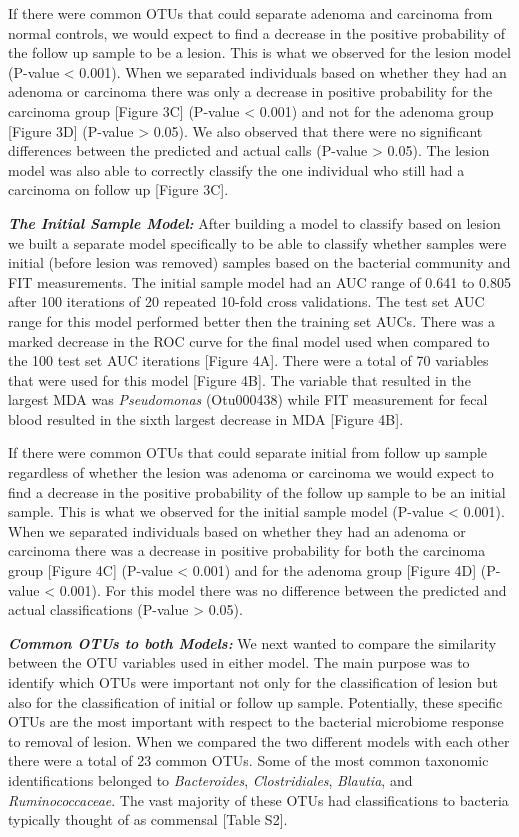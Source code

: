 \documentclass[12pt,]{article}
\begin{document}
If there were common OTUs that could separate adenoma and carcinoma from
normal controls, we would expect to find a decrease in the positive
probability of the follow up sample to be a lesion. This is what we
observed for the lesion model (P-value \textless{} 0.001). When we
separated individuals based on whether they had an adenoma or carcinoma
there was only a decrease in positive probability for the carcinoma
group {[}Figure 3C{]} (P-value \textless{} 0.001) and not for the
adenoma group {[}Figure 3D{]} (P-value \textgreater{} 0.05). We also
observed that there were no significant differences between the
predicted and actual calls (P-value \textgreater{} 0.05). The lesion
model was also able to correctly classify the one individual who still
had a carcinoma on follow up {[}Figure 3C{]}.

\textbf{\emph{The Initial Sample Model:}} After building a model to
classify based on lesion we built a separate model specifically to be
able to classify whether samples were initial (before lesion was
removed) samples based on the bacterial community and FIT measurements.
The initial sample model had an AUC range of 0.641 to 0.805 after 100
iterations of 20 repeated 10-fold cross validations. The test set AUC
range for this model performed better then the training set AUCs. There
was a marked decrease in the ROC curve for the final model used when
compared to the 100 test set AUC iterations {[}Figure 4A{]}. There were
a total of 70 variables that were used for this model {[}Figure 4B{]}.
The variable that resulted in the largest MDA was \emph{Pseudomonas}
(Otu000438) while FIT measurement for fecal blood resulted in the sixth
largest decrease in MDA {[}Figure 4B{]}.

If there were common OTUs that could separate initial from follow up
sample regardless of whether the lesion was adenoma or carcinoma we
would expect to find a decrease in the positive probability of the
follow up sample to be an initial sample. This is what we observed for
the initial sample model (P-value \textless{} 0.001). When we separated
individuals based on whether they had an adenoma or carcinoma there was
a decrease in positive probability for both the carcinoma group
{[}Figure 4C{]} (P-value \textless{} 0.001) and for the adenoma group
{[}Figure 4D{]} (P-value \textless{} 0.001). For this model there was no
difference between the predicted and actual classifications (P-value
\textgreater{} 0.05).

\textbf{\emph{Common OTUs to both Models:}} We next wanted to compare
the similarity between the OTU variables used in either model. The main
purpose was to identify which OTUs were important not only for the
classification of lesion but also for the classification of initial or
follow up sample. Potentially, these specific OTUs are the most
important with respect to the bacterial microbiome response to removal
of lesion. When we compared the two different models with each other
there were a total of 23 common OTUs. Some of the most common taxonomic
identifications belonged to \emph{Bacteroides}, \emph{Clostridiales},
\emph{Blautia}, and \emph{Ruminococcaceae}. The vast majority of these
OTUs had classifications to bacteria typically thought of as commensal
{[}Table S2{]}.
\end{document}
